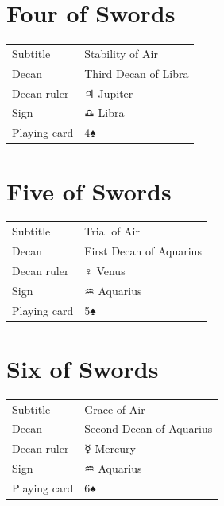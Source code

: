 \newpage
\section*{Four of Swords}

\begin{center}
\end{center}

\vspace{4mm}
\noindent\begin{tabular}{@{}l@{\quad}l@{}}
Subtitle & Stability of Air \\
Decan & Third Decan of Libra \\
Decan ruler & {\symbfont ♃} Jupiter \\
Sign & {\symbfont ♎} Libra \\
Playing card & 4♠ \\
\end{tabular}

\newpage
\section*{Five of Swords}

\begin{center}
\end{center}

\vspace{4mm}
\noindent\begin{tabular}{@{}l@{\quad}l@{}}
Subtitle & Trial of Air \\
Decan & First Decan of Aquarius \\
Decan ruler & {\symbfont ♀} Venus \\
Sign & {\symbfont ♒} Aquarius \\
Playing card & 5♠ \\
\end{tabular}

\newpage
\section*{Six of Swords}

\begin{center}
\end{center}

\vspace{4mm}
\noindent\begin{tabular}{@{}l@{\quad}l@{}}
Subtitle & Grace of Air \\
Decan & Second Decan of Aquarius \\
Decan ruler & {\symbfont ☿} Mercury \\
Sign & {\symbfont ♒} Aquarius \\
Playing card & 6♠ \\
\end{tabular}

